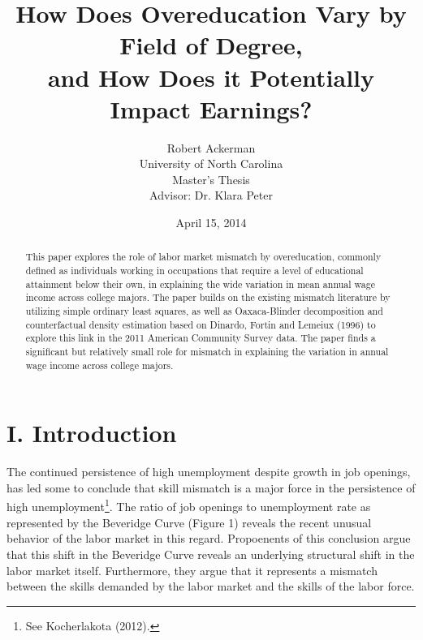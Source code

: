 \documentclass[11pt]{article}
\title{How Does Overeducation Vary by Field of Degree, \\ and How Does it Potentially Impact Earnings?}
\author{Robert Ackerman \\ University of North Carolina \\ Master's Thesis \\ Advisor: Dr. Klara Peter}
\date{April 15, 2014}							%
\theoremstyle{definition}
\begin{document}
\maketitle

\begin{abstract}
This paper explores the role of labor market mismatch by overeducation, commonly defined as individuals working in occupations that require a level of educational attainment below their own, in explaining the wide variation in mean annual wage income across college majors.  The paper builds on the existing mismatch literature by utilizing simple ordinary least squares, as well as Oaxaca-Blinder decomposition and counterfactual density estimation based on Dinardo, Fortin and Lemeiux (1996) to explore this link in the 2011 American Community Survey data.  The paper finds a significant but relatively small role for mismatch in explaining the variation in annual wage income across college majors.   
\end{abstract}

\section*{I. Introduction}
\indent
\par
The continued persistence of high unemployment despite growth in job openings, has led some to conclude that skill mismatch is a major force in the persistence of high unemployment\footnote{See Kocherlakota (2012).}.  The ratio of job openings to unemployment rate as represented by the Beveridge Curve (Figure 1) reveals the recent unusual behavior of the labor market in this regard.  Propoenents of this conclusion argue that this shift in the Beveridge Curve reveals an underlying structural shift in the labor market itself.  Furthermore, they argue that it represents a mismatch between the skills demanded by the labor market and the skills of the labor force.
\end{document}
